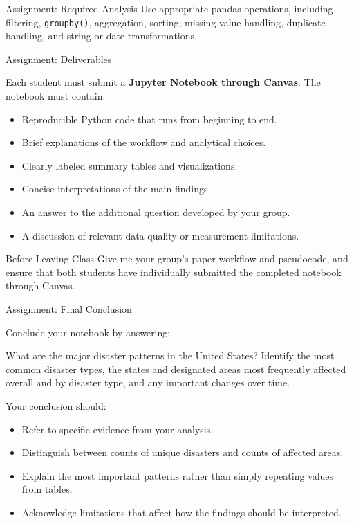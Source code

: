 \documentclass[11pt,aspectratio=43]{beamer}
\begin{document}
{\begin{frame}{Assignment: Required Analysis}
  Use appropriate pandas operations, including filtering,
  \texttt{groupby()}, aggregation, sorting, missing-value handling,
  duplicate handling, and string or date transformations.
\end{frame}


\begin{frame}{Assignment: Deliverables}
  \small

  Each student must submit a \textbf{Jupyter Notebook through Canvas}. The notebook must contain:

  \begin{itemize}
    \item Reproducible Python code that runs from beginning to end.
    \item Brief explanations of the workflow and analytical choices.
    \item Clearly labeled summary tables and visualizations.
    \item Concise interpretations of the main findings.
    \item An answer to the additional question developed by your group.
    \item A discussion of relevant data-quality or measurement limitations.
  \end{itemize}

  \begin{alertblock}{Before Leaving Class}
    Give me your group's paper workflow and pseudocode, and ensure that both students have individually submitted the completed notebook through Canvas.
  \end{alertblock}
\end{frame}


\begin{frame}{Assignment: Final Conclusion}
  \small

  Conclude your notebook by answering:

  \begin{block}{}
    What are the major disaster patterns in the United States? Identify the most common disaster types, the states and designated areas most frequently affected overall and by disaster type, and any important changes over time.
  \end{block}

  Your conclusion should:

  \begin{itemize}
    \item Refer to specific evidence from your analysis.
    \item Distinguish between counts of unique disasters and counts of affected areas.
    \item Explain the most important patterns rather than simply repeating values from tables.
    \item Acknowledge limitations that affect how the findings should be interpreted.
  \end{itemize}
\end{frame}

}
\end{document}
